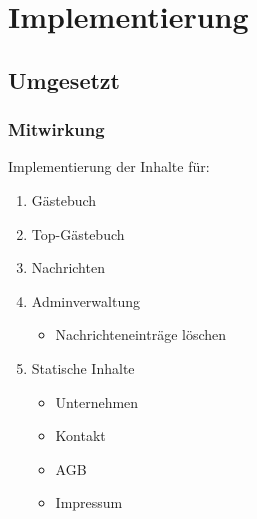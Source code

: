 \section{Implementierung}

\subsection{Umgesetzt}
\begin{frame}
	\frametitle{Mitwirkung}
	
	Implementierung der Inhalte für:
	\begin{enumerate}
		\item Gästebuch
		\item Top-Gästebuch
		\item Nachrichten
		\item Adminverwaltung
		\begin{itemize}
			\item Nachrichteneinträge löschen
		\end{itemize}
		\item Statische Inhalte
		\begin{itemize}
			\item Unternehmen
			\item Kontakt
			\item AGB
			\item Impressum
		\end{itemize}
	\end{enumerate}
\end{frame}

